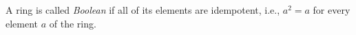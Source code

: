 A ring is called \emph{Boolean} if all of its elements are idempotent, i.e., $a^2 = a$ for every element $a$ of the ring.
